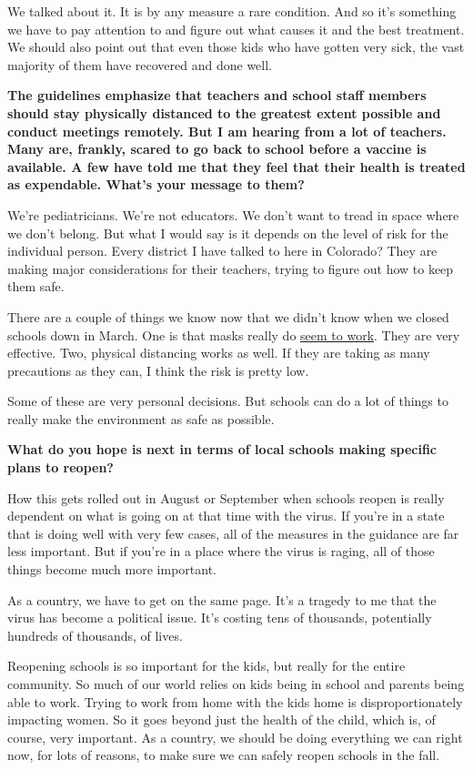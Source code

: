 We talked about it. It is by any measure a rare condition. And so it's
something we have to pay attention to and figure out what causes it and
the best treatment. We should also point out that even those kids who
have gotten very sick, the vast majority of them have recovered and done
well.

\textbf{The guidelines emphasize that teachers and school staff members
should stay physically distanced to the greatest extent possible and
conduct meetings remotely. But I am hearing from a lot of teachers. Many
are, frankly, scared to go back to school before a vaccine is available.
A few have told me that they feel that their health is treated as
expendable. What's your message to them?}

We're pediatricians. We're not educators. We don't want to tread in
space where we don't belong. But what I would say is it depends on the
level of risk for the individual person. Every district I have talked to
here in Colorado? They are making major considerations for their
teachers, trying to figure out how to keep them safe.

There are a couple of things we know now that we didn't know when we
closed schools down in March. One is that masks really do
\href{https://www.thelancet.com/journals/lancet/article/PIIS0140-6736(20)31142-9/fulltext}{seem
to work}. They are very effective. Two, physical distancing works as
well. If they are taking as many precautions as they can, I think the
risk is pretty low.

Some of these are very personal decisions. But schools can do a lot of
things to really make the environment as safe as possible.

\textbf{What do you hope is next in terms of local schools making
specific plans to reopen?}

How this gets rolled out in August or September when schools reopen is
really dependent on what is going on at that time with the virus. If
you're in a state that is doing well with very few cases, all of the
measures in the guidance are far less important. But if you're in a
place where the virus is raging, all of those things become much more
important.

As a country, we have to get on the same page. It's a tragedy to me that
the virus has become a political issue. It's costing tens of thousands,
potentially hundreds of thousands, of lives.

Reopening schools is so important for the kids, but really for the
entire community. So much of our world relies on kids being in school
and parents being able to work. Trying to work from home with the kids
home is disproportionately impacting women. So it goes beyond just the
health of the child, which is, of course, very important. As a country,
we should be doing everything we can right now, for lots of reasons, to
make sure we can safely reopen schools in the fall.

